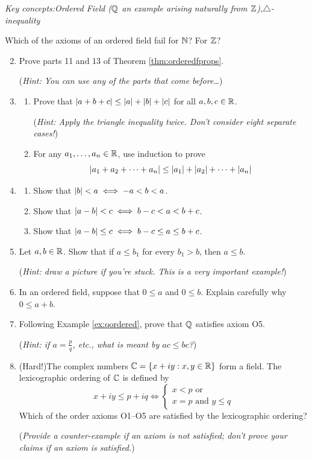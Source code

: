\begin{exercises}{}{}
	\emph{Key concepts:\quad Ordered Field ($\mathbb{Q}$ an example arising naturally from $\mathbb{Z}$),\quad $\triangle$-inequality}


	\exstart %
	Which of the axioms of an ordered field fail for $\mathbb{N}$? For $\mathbb{Z}$?
	\begin{enumerate}\setcounter{enumi}{1}
	  \item%
	  Prove parts 11 and 13 of Theorem \ref{thm:orderedfprops}.\par
	  (\emph{Hint: You can use any of the parts that come before\ldots})
	
	
	  \item%
	  \begin{enumerate}
	  	\item Prove that $\left| a+b+c\right|\le \left| a\right|+\left| b\right|+\left| c\right|$ for all $a,b,c\in\mathbb{R}$.\par
	  	(\emph{Hint: Apply the triangle inequality twice. Don't consider eight separate cases!})
	  	\item For any $a_1,\ldots,a_n\in\mathbb{R}$, use induction to prove
	  	\[
	  		\left| a_1+a_2+\cdots+a_n\right|\le\left| a_1\right|+\left| a_2\right|+\cdots+\left| a_n\right|
	  	\]
	  \end{enumerate}
	
	
	  \item%
	  \begin{enumerate}
	  	\item Show that $\left| b\right|<a\iff -a<b<a$.
	  	\item Show that $\left| a-b\right|<c\iff b-c<a<b+c$.
	  	\item Show that $\left| a-b\right|\le c\iff b-c\le a\le b+c$.
	  \end{enumerate}
	
	
	  \item%
	  Let $a,b\in\mathbb{R}$. Show that if $a\le b_1$ for every $b_1>b$, then $a\le b$.\par
	  (\emph{Hint: draw a picture if you're stuck. This is a very important example!})
	  
	  
	  \item In an ordered field, suppose that $0\le a$ and $0\le b$. Explain carefully why $0\le a+b$.
	  
	  
	  \item Following Example \ref{ex:qordered}, prove that $\mathbb{Q}$ satisfies axiom O5.\par
	  (\emph{Hint: if $a=\frac pq$, etc., what is meant by $ac\le bc$?}) 
	  
	  
	  \item (Hard!)\lstsp The complex numbers $\mathbb{C}=\{x+iy:x,y\in\mathbb{R}\}$ form a field. The lexicographic ordering of $\mathbb{C}$ is defined by
	  \[
	  	x+iy\le p+iq\iff
	  	\begin{cases}
	  		x<p\text{ or}\\
	  		x=p\text{ and }y\le q
	  	\end{cases}
	  \]
	  Which of the order axioms O1--O5 are satisfied by the lexicographic ordering?\par
	  (\emph{Provide a counter-example if an axiom is not satisfied; don't prove your claims if an axiom is satisfied.})
	\end{enumerate}
\end{exercises}


